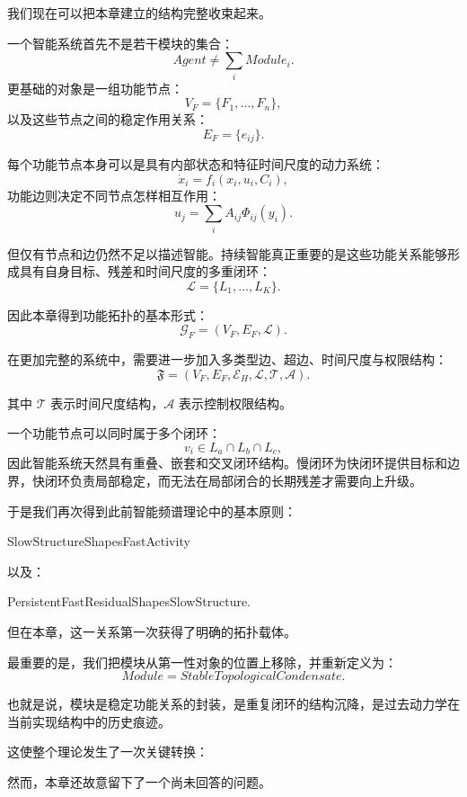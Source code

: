 我们现在可以把本章建立的结构完整收束起来。

一个智能系统首先不是若干模块的集合：
\[
Agent
\neq
\sum_i Module_i.
\]
更基础的对象是一组功能节点：
\[
V_F
=
\{F_1,\ldots,F_n\},
\]
以及这些节点之间的稳定作用关系：
\[
E_F
=
\{e_{ij}\}.
\]

每个功能节点本身可以是具有内部状态和特征时间尺度的动力系统：
\[
\dot{x}_i
=
f_i(x_i,u_i,C_i),
\]
功能边则决定不同节点怎样相互作用：
\[
u_j
=
\sum_i
A_{ij}\Phi_{ij}(y_i).
\]

但仅有节点和边仍然不足以描述智能。持续智能真正重要的是这些功能关系能够形成具有自身目标、残差和时间尺度的多重闭环：
\[
\mathcal L
=
\{L_1,\ldots,L_K\}.
\]

因此本章得到功能拓扑的基本形式：
\[
\boxed{
\mathcal G_F
=
(V_F,E_F,\mathcal L).
}
\]

在更加完整的系统中，需要进一步加入多类型边、超边、时间尺度与权限结构：
\[
\boxed{
\mathfrak F
=
\left(
V_F,
E_F,
\mathcal E_H,
\mathcal L,
\mathcal T,
\mathcal A
\right).
}
\]

其中 $\mathcal T$ 表示时间尺度结构，$\mathcal A$ 表示控制权限结构。

一个功能节点可以同时属于多个闭环：
\[
v_i\in
L_a\cap L_b\cap L_c,
\]
因此智能系统天然具有重叠、嵌套和交叉闭环结构。慢闭环为快闭环提供目标和边界，快闭环负责局部稳定，而无法在局部闭合的长期残差才需要向上升级。

于是我们再次得到此前智能频谱理论中的基本原则：
\begin{statementbox}
SlowStructureShapesFastActivity
\end{statementbox}
以及：
\begin{statementbox}
PersistentFastResidualShapesSlowStructure.
\end{statementbox}

但在本章，这一关系第一次获得了明确的拓扑载体。

最重要的是，我们把模块从第一性对象的位置上移除，并重新定义为：
\[
\boxed{
Module
=
StableTopologicalCondensate.
}
\]

也就是说，模块是稳定功能关系的封装，是重复闭环的结构沉降，是过去动力学在当前实现结构中的历史痕迹。

这使整个理论发生了一次关键转换：
\begin{statementbox}
\centering
{}
\end{statementbox}

然而，本章还故意留下了一个尚未回答的问题。

